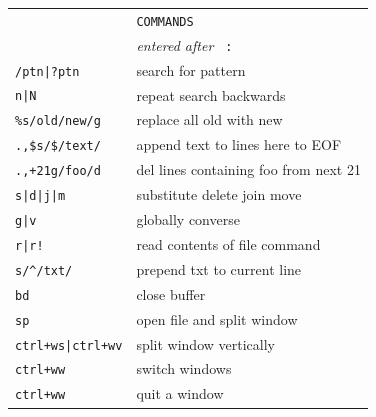 \documentclass[a4paper,12pt]{article}
\begin{document}
\begin{multicols}{2}
\begin{tabular}{ll}
&\texttt{COMMANDS}\\
&\emph{entered after }\texttt{ :}\\
\texttt{/ptn|?ptn}& search \textbar{} for pattern\\
\texttt{n|N}& repeat search \textbar{} backwards\\
\texttt{\%s/old/new/g}&replace all old with new\\
\texttt{.,\$s/\$/text/}&append text to lines here to EOF\\
\texttt{.,+21g/foo/d}&del lines containing foo from next 21\\
\texttt{s|d|j|m}&substitute \textbar{} delete \textbar{} join \textbar{}move\\
\texttt{g|v}& globally \textbar{} converse\\
\texttt{r|r!}& read contents of file \textbar{} command\\
\texttt{s/\^{}/txt/}&prepend txt to current line\\
\texttt{bd}&close buffer\\
\texttt{sp}&open file and split window\\
\texttt{ctrl+ws|ctrl+wv}&split window\textbar{} vertically\\
\texttt{ctrl+ww}&switch windows\\
\texttt{ctrl+ww}&quit a window\\
\end{tabular}


\end{multicols}
\end{document}
